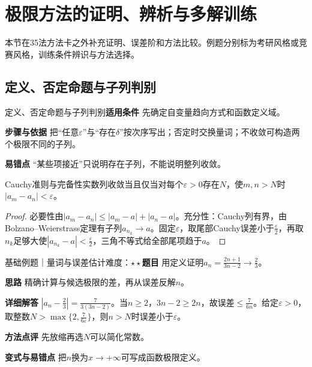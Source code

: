 \section{极限方法的证明、辨析与多解训练}\label{deep:limits_source_deep}

\begin{examtip}本节在35法方法卡之外补充证明、误差阶和方法比较。例题分别标为考研风格或竞赛风格，训练条件辨识与方法选择。\end{examtip}

\subsection{定义、否定命题与子列判别}\label{deep:limits_source_deep:logic}

\begin{method}{定义、否定命题与子列判别}\textbf{适用条件} 先确定自变量趋向方式和函数定义域。\par\textbf{步骤与依据} 把“任意$\varepsilon$”与“存在$\delta$”按次序写出；否定时交换量词；不收敛可构造两个极限不同的子列。\par\textbf{易错点} “某些项接近”只说明存在子列，不能说明整列收敛。\end{method}

\begin{theorem}{Cauchy准则与完备性}实数列收敛当且仅当对每个$\varepsilon>0$存在$N$，使$m,n>N$时$|a_m-a_n|<\varepsilon$。\end{theorem}\begin{proof}必要性由$|a_m-a_n|\le |a_m-a|+|a_n-a|$。充分性：Cauchy列有界，由Bolzano--Weierstrass定理有子列$a_{n_k}\to a$。固定$\varepsilon$，取尾部Cauchy误差小于$\frac{\varepsilon}{2}$，再取$n_k$足够大使$|a_{n_k}-a|<\frac{\varepsilon}{2}$，三角不等式给全部尾项趋于$a$。\end{proof}

\begin{example}{基础例题｜量词与误差估计}{难度：$\star\star$}\label{deep:ex:limits_source_deep:eps}\textbf{题目} 用定义证明$a_n=\frac{2n+1}{3n-2}\to\frac{2}{3}$。\par\textbf{思路} 精确计算与候选极限的差，再从误差反解$n$。\par\textbf{详细解答} $|a_n-\frac{2}{3}|=\frac{7}{3(3n-2)}$。当$n\ge2$，$3n-2\ge2n$，故误差$\le\frac{7}{6n}$。给定$\varepsilon>0$，取整数$N>\max\{2,\frac{7}{6\varepsilon}\}$，则$n>N$时误差小于$\varepsilon$。\par\textbf{方法点评} 先放缩再选$N$可以简化常数。\par\textbf{变式与易错点} 把$n$换为$x\to+\infty$可写成函数极限定义。\end{example}

